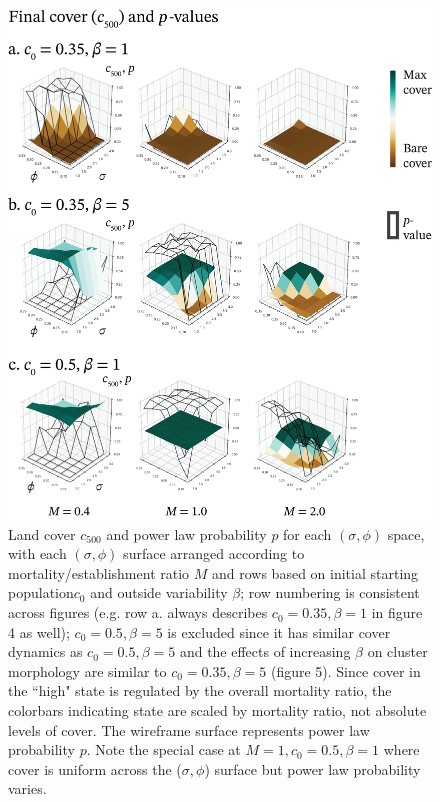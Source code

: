 \documentclass[10pt]{article}
\begin{document}
\begin{figure}
 	\begin{center}
		\includegraphics{f3_cover_results.png}
	\end{center}
		\caption{Land cover $c_{500}$ and power law probability $p$ for each $(\sigma,\phi)$ space, with each $(\sigma,\phi)$ surface arranged according to mortality/establishment ratio $M$ and rows based on initial starting population$c_0$ and outside variability $\beta$; row numbering is consistent across figures (e.g. row a. always describes $c_0 = 0.35, \beta = 1$ in figure 4 as well); $c_0 = 0.5, \beta = 5$ is excluded since it has similar cover dynamics as $c_0 = 0.5, \beta = 5$ and the effects of increasing $\beta$ on cluster morphology are similar to $c_0 = 0.35,\beta = 5$ (figure 5). Since cover in the ``high" state is regulated by the overall mortality ratio, the colorbars indicating state are scaled by mortality ratio, not absolute levels of cover. The wireframe surface represents power law probability $p$. Note the special case at $M = 1, c_0 = 0.5, \beta = 1$ where cover is uniform across the ($\sigma,\phi$) surface but power law probability varies.}
\end{figure}
\end{document}
